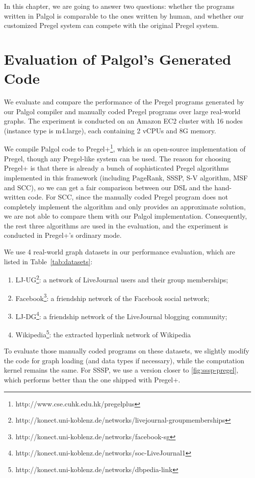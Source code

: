 \documentclass{sokendai_thesis} %
\begin{document}
In this chapter, we are going to answer two questions: whether the programs written in Palgol is comparable to the ones written by human, and whether our customized Pregel system can compete with the original Pregel system.

\section{Evaluation of Palgol's Generated Code}

We evaluate and compare the performance of the Pregel programs generated by our Palgol compiler and manually coded Pregel programs over large real-world graphs.
The experiment is conducted on an Amazon EC2 cluster with 16 nodes (instance type is m4.large), each containing 2 vCPUs and 8G memory.

We compile Palgol code to Pregel+\footnote{http://www.cse.cuhk.edu.hk/pregelplus}, which is an open-source implementation of Pregel, though any Pregel-like system can be used.
The reason for choosing Pregel+ is that there is already a bunch of sophisticated Pregel algorithms implemented in this framework (including PageRank, SSSP, S-V algorithm, MSF and SCC), so we can get a fair comparison between our DSL and the hand-written code.
For SCC, since the manually coded Pregel program does not completely implement the algorithm and only provides an approximate solution, we are not able to compare them with our Palgol implementation.
Consequently, the rest three algorithms are used in the evaluation, and the experiment is conducted in Pregel+'s ordinary mode.

We use 4 real-world graph datasets in our performance evaluation, which are listed in Table~\ref{tab:datasets}:
\begin{enumerate}
\item LJ-UG\footnote{http://konect.uni-koblenz.de/networks/livejournal-groupmemberships}: a network of LiveJournal users and their group memberships;
\item Facebook\footnote{http://konect.uni-koblenz.de/networks/facebook-sg}: a friendship network of the Facebook social network;
\item LJ-DG\footnote{http://konect.uni-koblenz.de/networks/soc-LiveJournal1}: a friendship network of the LiveJournal blogging community;
\item Wikipedia\footnote{http://konect.uni-koblenz.de/networks/dbpedia-link}: the extracted hyperlink network of Wikipedia
\end{enumerate}
To evaluate those manually coded programs on these datasets, we slightly modify the code for graph loading (and data types if necessary), while the computation kernel remains the same.
For SSSP, we use a version closer to \autoref{fig:sssp-pregel}, which performs better than the one shipped with Pregel+.
\end{document}
